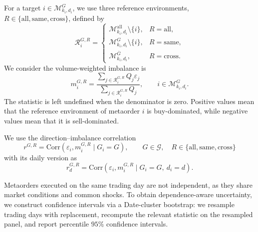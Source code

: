 \documentclass[11pt]{article}
\begin{document}
For a target \(i\in\mathcal{M}_{k_i,d_i}^{G}\), we use three reference
environments,
\(R\in\{\mathrm{all},\mathrm{same},\mathrm{cross}\}\), defined by
\begin{equation}
  \mathcal{R}_i^{G,R} =
  \begin{cases}
    \mathcal{M}_{k_i,d_i}^{\mathrm{all}}\setminus\{i\},
      & R=\mathrm{all},\\
    \mathcal{M}_{k_i,d_i}^{G}\setminus\{i\},
      & R=\mathrm{same},\\
    \mathcal{M}_{k_i,d_i}^{\bar G},
      & R=\mathrm{cross}.
  \end{cases}
  \label{eq:crowding_reference_sets}
\end{equation}
We consider the volume-weighted imbalance is
\begin{equation}
  m_i^{G,R}
  =
  \frac{\displaystyle\sum_{j\in\mathcal{R}_i^{G,R}} Q_j\varepsilon_j}
       {\displaystyle\sum_{j\in\mathcal{R}_i^{G,R}} Q_j},
  \qquad i\in\mathcal{M}_{k_i,d_i}^{G}.
  \label{eq:crowding_imbalance}
\end{equation}
The statistic is left undefined when the denominator is zero. Positive values
mean that the reference environment of metaorder \(i\) is buy-dominated, while
negative values mean that it is sell-dominated.

We use the direction--imbalance correlation
\begin{equation}
  r^{G,R}
  =
  \mathrm{Corr}\!\left(\varepsilon_i,m_i^{G,R}\mid G_i=G\right),
  \qquad G\in\mathcal{G},\quad R\in\{\mathrm{all},\mathrm{same},\mathrm{cross}\}
  \label{eq:crowding_correlation}
\end{equation}
with its daily version as
\begin{equation}
  r_d^{G,R}
  =
  \mathrm{Corr}\!\left(\varepsilon_i,m_i^{G,R}\mid G_i=G,\ d_i=d\right).
  \label{eq:daily_crowding_correlation}
\end{equation}

Metaorders executed on the same trading day are not independent, as they
share market conditions and common shocks. To obtain dependence-aware
uncertainty, we construct confidence intervals via a Date-cluster
bootstrap: we resample trading days with replacement, recompute the
relevant statistic on the resampled panel, and report percentile
\(95\%\) confidence intervals.
\end{document}
